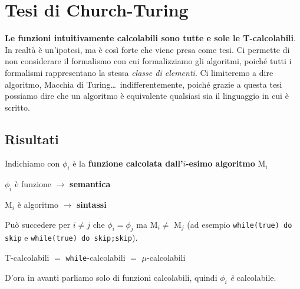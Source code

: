 \documentclass[10pt]{book}
\begin{document}
\section{Tesi di Church-Turing}
\textbf{Le funzioni intuitivamente calcolabili sono tutte e sole le T-calcolabili}.\\
In realtà è un'ipotesi, ma è così forte che viene presa come tesi. Ci permette di non considerare il formalismo con cui formalizziamo gli algoritmi, poiché tutti i formalismi rappresentano la stessa \textit{classe di elementi}. Ci limiteremo a dire algoritmo, Macchia di Turing\ldots$\,$ indifferentemente, poiché grazie a questa tesi possiamo dire che un algoritmo è equivalente qualsiasi sia il linguaggio in cui è scritto.
\subsection{Risultati}
Indichiamo con $\phi_i$ è la \textbf{funzione calcolata dall'$i$-esimo algoritmo} M$_i$
\begin{list}{}{}
	\item $\phi_i$ è funzione $\rightarrow$ \textbf{semantica}
	\item M$_i$ è algoritmo $\rightarrow$ \textbf{sintassi}
\end{list}
Può succedere per $i \neq j$ che $\phi_i = \phi_j$ ma M$_i \neq$ M$_j$ (ad esempio \texttt{while(true) do skip} e \texttt{while(true) do skip;skip}).
\begin{center}
T-calcolabili $=$ \texttt{while}-calcolabili $=$ $\mu$-calcolabili
\end{center}
D'ora in avanti parliamo solo di funzioni calcolabili, quindi $\phi_i$ \textit{è} calcolabile.
\end{document}

